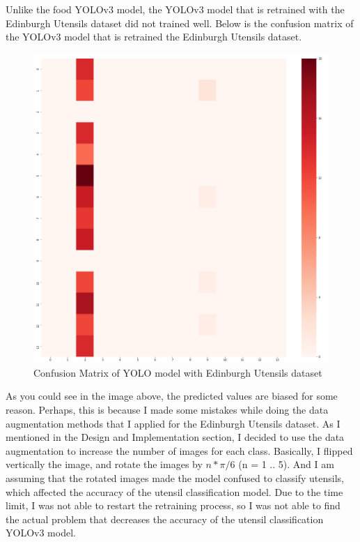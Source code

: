 \documentclass{article}
\begin{document}
Unlike the food YOLOv3 model, the YOLOv3 model that is retrained with the Edinburgh Utensils dataset did not trained well. Below is the confusion matrix of the YOLOv3 model that is retrained the Edinburgh Utensils dataset.

\begin{figure}[H]
    \centering
    \includegraphics[scale=0.4]{imgs/cm_utensils.png}
    \caption{Confusion Matrix of YOLO model with Edinburgh Utensils dataset}
    \label{fig:cm_food100}
\end{figure}

As you could see in the image above, the predicted values are biased for some reason. Perhaps, this is because I made some mistakes while doing the data augmentation methods that I applied for the Edinburgh Utensils dataset. As I mentioned in the Design and Implementation section, I decided to use the data augmentation to increase the number of images for each class. Basically, I flipped vertically the image, and rotate the images by $n * \pi / 6$ (n = 1 .. 5). And I am assuming that the rotated images made the model confused to classify utensils, which affected the accuracy of the utensil classification model. Due to the time limit, I was not able to restart the retraining process, so I was not able to find the actual problem that decreases the accuracy of the utensil classification YOLOv3 model.
\end{document}
